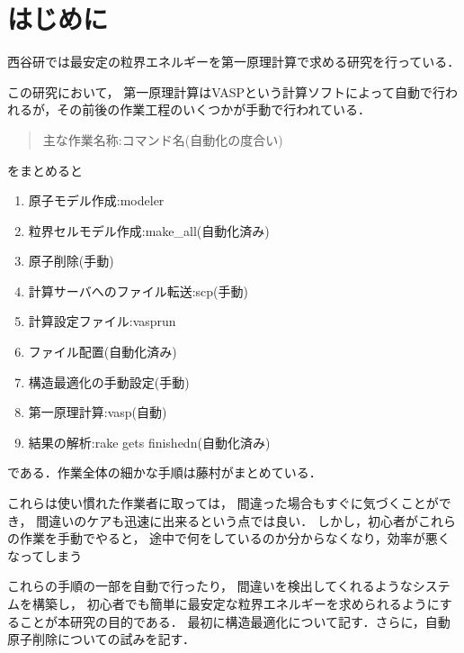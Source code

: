 \chapter{はじめに}\label{ux306fux3058ux3081ux306b}

    西谷研では最安定の粒界エネルギーを第一原理計算で求める研究を行っている．

この研究において，
第一原理計算はVASPという計算ソフトによって自動で行われるが，その前後の作業工程のいくつかが手動で行われている．
\begin{quote}
主な作業名称:コマンド名(自動化の度合い)
\end{quote}
をまとめると 
\begin{enumerate}
\item 原子モデル作成:modeler
\item 粒界セルモデル作成:make\_all(自動化済み)
\item 原子削除(手動)
\item 計算サーバへのファイル転送:scp(手動)
\item 計算設定ファイル:vasprun
\item ファイル配置(自動化済み)
\item 構造最適化の手動設定(手動)
\item 第一原理計算:vasp(自動)
\item 結果の解析:rake gets finishedn(自動化済み)
\end{enumerate}
である．作業全体の細かな手順は藤村がまとめている\cite{fujimura2018}．

これらは使い慣れた作業者に取っては，
間違った場合もすぐに気づくことができ，
間違いのケアも迅速に出来るという点では良い．
しかし，初心者がこれらの作業を手動でやると，
途中で何をしているのか分からなくなり，効率が悪くなってしまう

これらの手順の一部を自動で行ったり，
間違いを検出してくれるようなシステムを構築し，
初心者でも簡単に最安定な粒界エネルギーを求められるようにすることが本研究の目的である．
最初に構造最適化について記す．さらに，自動原子削除についての試みを記す．
    